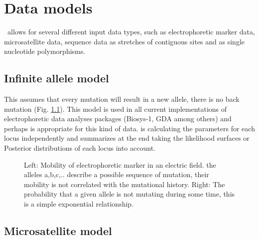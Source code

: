 \chapter{Data models}


\migrate\ allows for several different input data types, such as electrophoretic marker data, microsatellite data, sequence data as stretches of contiguous sites and as single nucleotide polymorphisms.
 
\section{Infinite allele model}
This assumes 
that every 
mutation will 
result in a new 
allele, there is no back mutation (Fig. \ref{EPFIG}). This model is used in all current implementations of electrophoretic data analyses packages (Biosys-1, GDA among others)
and perhaps is appropriate for this kind of data. \migrate is calculating the parameters for 
each locus independently and summarizes at the end taking the likelihood surfaces or Posterior distributions of each locus into account.
\begin{figure}[thb]
\begin{center}
\end{center}
\caption{Left: Mobility of electrophoretic marker in an electric field. the alleles a,b,c,.. describe a possible sequence of mutation, their mobility is not correlated with the mutational history. Right: The probability that a given allele is not mutating during some time, 
this is a simple exponential relationship.}
\label{EPFIG}
\end{figure}
\newpage
\section{Microsatellite model}
